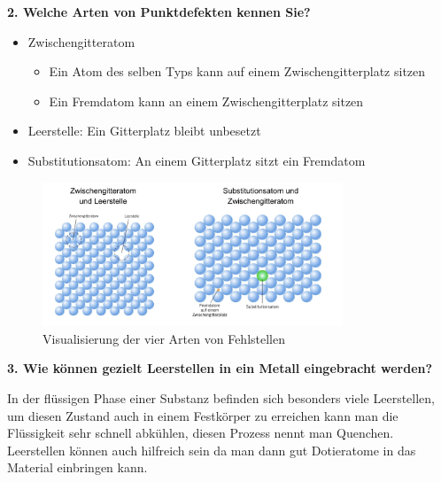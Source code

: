 \noindent\textbf{2. Welche Arten von Punktdefekten kennen Sie?}\\
\begin{addmargin}[25pt]{0pt}    
\begin{itemize}
    \item Zwischengitteratom
    \begin{itemize}
        \item Ein Atom des selben Typs kann auf einem Zwischengitterplatz sitzen
        \item Ein Fremdatom kann an einem Zwischengitterplatz sitzen
    \end{itemize}
    \item Leerstelle: Ein Gitterplatz bleibt unbesetzt
    \item Substitutionsatom: An einem Gitterplatz sitzt ein Fremdatom
\end{itemize}
\begin{figure}[h]
    \centering
    \includegraphics[width = 0.8\textwidth]{images/Materialwissenschaften/Fehlstellen.jpeg}
    \caption{Visualisierung der vier Arten von Fehlstellen}
    \label{fig:Fehlstellen}
\end{figure}
\end{addmargin}

\noindent\textbf{3. Wie können gezielt Leerstellen in ein Metall eingebracht werden?}\\
\begin{addmargin}[25pt]{0pt}    
In der flüssigen Phase einer Substanz befinden sich besonders viele Leerstellen, um diesen Zustand auch in einem Festkörper zu erreichen kann man die Flüssigkeit sehr schnell abkühlen, diesen Prozess nennt man Quenchen. Leerstellen können auch hilfreich sein da man dann gut Dotieratome in das Material einbringen kann.\\
\end{addmargin}

